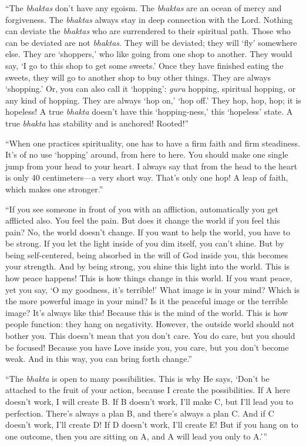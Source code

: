 \documentclass[12pt, twoside, openright]{memoir}
\begin{document}
\enquote{The \textit{bhaktas} don’t have any egoism. The \textit{bhaktas} are an ocean of mercy and forgiveness. The \textit{bhaktas} always stay in deep connection with the Lord. Nothing can deviate the \textit{bhaktas} who are surrendered to their spiritual path. Those who can be deviated are not \textit{bhaktas}. They will be deviated; they will \enquote{fly} somewhere else. They are \enquote{shoppers,} who like going from one shop to another. They would say, \enquote{I go to this shop to get some sweets.} Once they have finished eating the sweets, they will go to another shop to buy other things. They are always \enquote{shopping.} Or, you can also call it \enquote{hopping}: \textit{guru} hopping, spiritual hopping, or any kind of hopping. They are always \enquote{hop on,} \enquote{hop off.} They hop, hop, hop; it is hopeless! A true \textit{bhakta} doesn’t have this \enquote{hopping-ness,} this \enquote{hopeless} state. A true \textit{bhakta} has stability and is anchored! Rooted!}

\enquote{When one practices spirituality, one has to have a firm faith and firm steadiness. It’s of no use \enquote{hopping} around, from here to here. You should make one single jump from your head to your heart. I always say that from the head to the heart is only 40 centimeters---a very short way. That’s only one hop! A leap of faith, which makes one stronger.}

\enquote{If you see someone in front of you with an affliction, automatically you get afflicted also. You feel the pain. But does it change the world if you feel this pain? No, the world doesn’t change. If you want to help the world, you have to be strong. If you let the light inside of you dim itself, you can’t shine. But by being self-centered, being absorbed in the will of God inside you, this becomes your strength. And by being strong, you shine this light into the world. This is how peace happens! This is how things change in this world. If you want peace, yet you say, \enquote{O my goodness, it’s terrible!} What image is in your mind? Which is the more powerful image in your mind? Is it the peaceful image or the terrible image? It’s always like this! Because this is the mind of the world. This is how people function: they hang on negativity. However, the outside world should not bother you. This doesn’t mean that you don’t care. You do care, but you should be focused! Because you have Love inside you, you care, but you don’t become weak. And in this way, you can bring forth change.}

\enquote{The \textit{bhakta} is open to many possibilities. This is why He says, \enquote{Don’t be attached to the fruit of your action, because I create the possibilities. If A here doesn’t work, I will create B. If B doesn’t work, I’ll make C, but I’ll lead you to perfection. There’s always a plan B, and there’s always a plan C. And if C doesn’t work, I’ll create D! If D doesn’t work, I’ll create E! But if you hang on to one outcome, then you are sitting on A, and A will lead you only to A.}}
\end{document}
